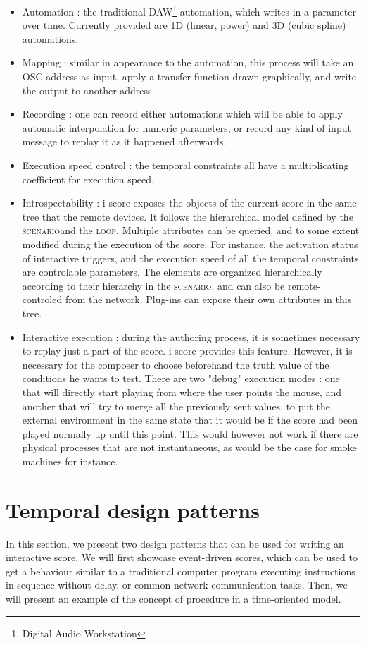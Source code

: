 \documentclass{article}
\newcommand{\scenario}{\textsc{scenario}}
\newcommand{\Loop}{\textsc{loop}}
\begin{document}
\begin{itemize}
\item Automation : the traditional DAW\footnote{Digital Audio Workstation} automation, which writes in a parameter over time. 
Currently provided are 1D (linear, power) and 3D (cubic spline) automations.
\item Mapping : similar in appearance to the automation, this process will take an OSC address as input, apply a transfer function drawn graphically, and write the output to another address.
\item Recording : one can record either automations which will be able to apply automatic interpolation for numeric parameters, or record any kind of input message to replay it as it happened afterwards.
\item Execution speed control : the temporal constraints all have a multiplicating coefficient for execution speed.
\item Introspectability : i-score exposes the objects of the current score in the same tree that the remote devices. 
It follows the hierarchical model defined by the \scenario and the \Loop.
Multiple attributes can be queried, and to some extent modified during the execution of the score. 
For instance, the activation status of interactive triggers, and the execution speed of all the temporal constraints are controlable parameters.
The elements are organized hierarchically according to their hierarchy in the \scenario, and can also be remote-controled from the network.
Plug-ins can expose their own attributes in this tree.
\item Interactive execution : during the authoring process, it is sometimes necessary to replay just a part of the score.
i-score provides this feature. 
However, it is necessary for the composer to choose beforehand the truth value of the conditions he wants to test.
There are two "debug" execution modes : one that will directly start playing from where the user points the mouse, and another that will try to merge all the previously sent values, to put the external environment in the same state that it would be if the score had been played normally up until this point. 
This would however not work if there are physical processes that are not instantaneous, as would be the case for smoke machines for instance.
\end{itemize}

\section{Temporal design patterns}
In this section, we present two design patterns that can be used 
for writing an interactive score.
We will first showcase event-driven scores, which can be used to get a behaviour 
similar to a traditional computer program executing instructions in sequence without delay, or common network communication tasks.
Then, we will present an example of the concept of procedure in a time-oriented model.
\end{document}

